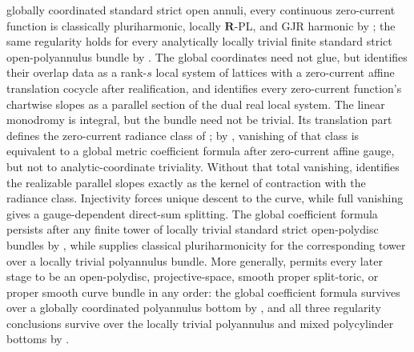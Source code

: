 \begin{enumerate}
      globally coordinated standard strict open annuli, every continuous
      zero-current function is classically pluriharmonic, locally
      \(\mathbf R\)-PL, and GJR harmonic by
      ; the same
      regularity holds for every analytically locally trivial finite standard
      strict open-polyannulus bundle by
      .  The global
      coordinates need not glue, but
       identifies their
      overlap data as a rank-\(s\) local system of lattices with a zero-current
      affine translation cocycle after realification, and identifies every
      zero-current function's chartwise slopes as a parallel section of the
      dual real local system.  The linear monodromy is integral, but the
      bundle need not be trivial.  Its translation part defines the
      zero-current radiance class of
      ; by
      , vanishing of that
      class is equivalent to a global metric coefficient formula after
      zero-current affine gauge, but not to analytic-coordinate triviality.
      Without that total vanishing,
       identifies the
      realizable parallel slopes exactly as the kernel of contraction with
      the radiance class.  Injectivity forces unique descent to the curve,
      while full vanishing gives a gauge-dependent direct-sum splitting.
      The global
      coefficient formula persists after any finite tower of locally trivial
      standard strict open-polydisc bundles by
      , while
       supplies
      classical pluriharmonicity for the corresponding tower over a locally
      trivial polyannulus bundle.  More generally,
       permits every later
      stage to be an open-polydisc, projective-space, smooth proper
      split-toric, or proper smooth curve bundle in any order: the global
      coefficient formula survives over a
      globally coordinated polyannulus bottom by
      , and all three
      regularity conclusions survive over the locally trivial polyannulus
      and mixed polycylinder bottoms by
      .

\end{enumerate}
